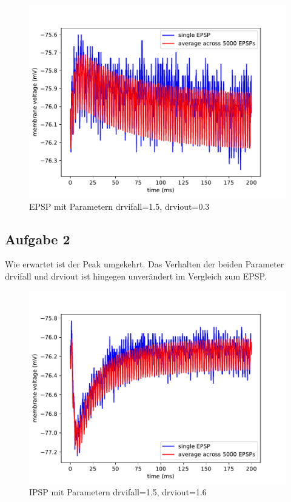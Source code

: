 \documentclass[10pt,a4paper]{scrartcl}
\begin{document}
\begin{figure} [ht]
\begin{center}
\label{fig:abb08}
\caption{EPSP mit Parametern drvifall=1.5, drviout=0.3}
\includegraphics[scale=0.35]{pictures/epsp_fall_1_5_out_0_3.pdf} 
\end{center}
\end{figure}


\subsection{Aufgabe 2}
Wie erwartet ist der Peak umgekehrt. Das Verhalten der beiden Parameter drvifall und drviout ist hingegen unverändert im Vergleich zum EPSP.


\begin{figure} [ht]
\begin{center}
\label{fig:abb09}
\caption{IPSP mit Parametern drvifall=1.5, drviout=1.6}
\includegraphics[scale=0.35]{pictures/epsp_inhibitory_fall_1_5_out_1_6.pdf} 
\end{center}
\end{figure}
\end{document}
